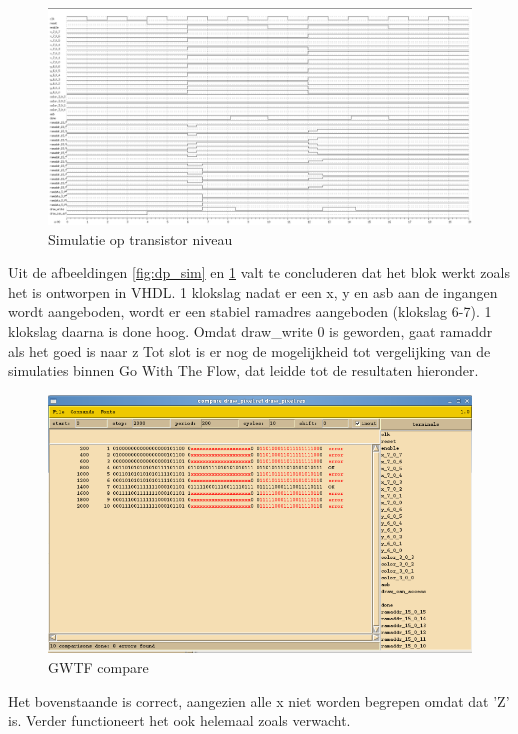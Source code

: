 \documentclass{scrartcl} %
\begin{document}
\begin{figure} [h!]
\includegraphics [width = \textwidth] {resource/dp_sw_lev}
\caption{Simulatie op transistor niveau}
\label{fig:dp_sw_lev}
\end{figure}
Uit de afbeeldingen \ref{fig:dp_sim} en \ref{fig:dp_sw_lev} valt te concluderen dat het blok werkt zoals het is ontworpen in VHDL. 1 klokslag nadat er een x, y en asb aan de ingangen wordt aangeboden, wordt er een stabiel ramadres aangeboden (klokslag 6-7). 1 klokslag daarna is done hoog. Omdat draw\_write 0 is geworden, gaat ramaddr als het goed is naar z
 Tot slot is er nog de mogelijkheid tot vergelijking van de simulaties binnen Go With The Flow, dat leidde tot de resultaten hieronder.
\begin{figure} [h!]
\includegraphics [width = \textwidth] {resource/dp_comp}
\caption{GWTF compare}
\label{fig:dp_comp}
\end{figure}
Het bovenstaande is correct, aangezien alle x niet worden begrepen omdat dat 'Z' is. Verder functioneert het ook helemaal zoals verwacht.
\end{document}
